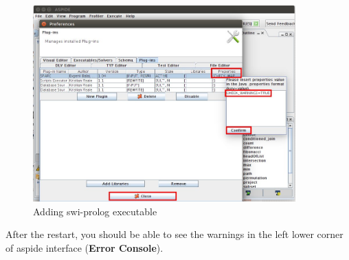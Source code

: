 \documentclass[12pt, letterpaper]{article}
\begin{document}
\begin{figure}[ht]
\centering
\includegraphics[width=0.9\textwidth]{property.jpg}
\caption{Adding swi-prolog executable}
\label{fig:addprop}
\end{figure}
\pagebreak
After the restart, you should be able to see the warnings in the  left lower corner of aspide interface (\textbf{Error Console}). 



\end{document}

